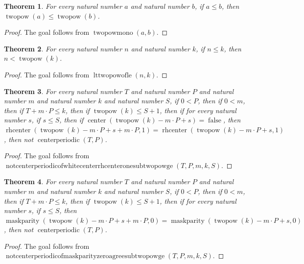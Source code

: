 \documentclass[11pt]{article}
\newtheorem{theorem}{Theorem}[section]
\theoremstyle{definition}
\begin{document}
\begin{theorem}
\label{ll:paper:twopow-mono}
For every natural number \(a\) and natural number \(b\), if \(a \le b\), then \(\operatorname{twopow}(a) \le \operatorname{twopow}(b)\).
\end{theorem}
\begin{proof}
The goal follows from \(\operatorname{twopowmono}(a, b)\).
\end{proof}
\begin{theorem}
\label{ll:paper:lt-twopow-of-le}
For every natural number \(n\) and natural number \(k\), if \(n \le k\), then \(n < \operatorname{twopow}(k)\).
\end{theorem}
\begin{proof}
The goal follows from \(\operatorname{lttwopowofle}(n, k)\).
\end{proof}
\begin{theorem}
\label{ll:paper:not-centerperiodic-of-white-center-rhcenter-one-sub-twopow-ge}
For every natural number \(T\) and natural number \(P\) and natural number \(m\) and natural number \(k\) and natural number \(S\), if \(0 < P\), then if \(0 < m\), then if \(T + m \cdot P \le k\), then if \(\operatorname{twopow}(k) \le S + 1\), then if for every natural number \(s\), if \(s \le S\), then if \(\operatorname{center}(\operatorname{twopow}(k) - m \cdot P + s) = \operatorname{false}\), then \(\operatorname{rhcenter}(\operatorname{twopow}(k) - m \cdot P + s + m \cdot P, 1) = \operatorname{rhcenter}(\operatorname{twopow}(k) - m \cdot P + s, 1)\), then not \(\operatorname{centerperiodic}(T, P)\).
\end{theorem}
\begin{proof}
The goal follows from \(\operatorname{notcenterperiodicofwhitecenterrhcenteronesubtwopowge}(T, P, m, k, S)\).
\end{proof}
\begin{theorem}
\label{ll:paper:not-centerperiodic-of-maskparity-zero-agree-sub-twopow-ge}
For every natural number \(T\) and natural number \(P\) and natural number \(m\) and natural number \(k\) and natural number \(S\), if \(0 < P\), then if \(0 < m\), then if \(T + m \cdot P \le k\), then if \(\operatorname{twopow}(k) \le S + 1\), then if for every natural number \(s\), if \(s \le S\), then \(\operatorname{maskparity}(\operatorname{twopow}(k) - m \cdot P + s + m \cdot P, 0) = \operatorname{maskparity}(\operatorname{twopow}(k) - m \cdot P + s, 0)\), then not \(\operatorname{centerperiodic}(T, P)\).
\end{theorem}
\begin{proof}
The goal follows from \(\operatorname{notcenterperiodicofmaskparityzeroagreesubtwopowge}(T, P, m, k, S)\).
\end{proof}
\end{document}
